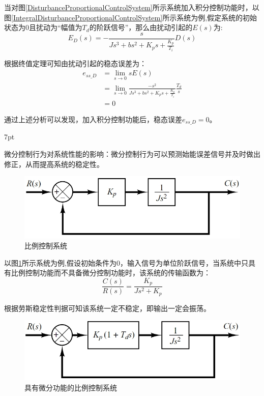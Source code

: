 \documentclass{article}
\numberwithin{equation}{section}
\numberwithin{figure}{section}
\newenvironment{formal}{%
\def\FrameCommand{%
\hspace{1pt}%
{\color{DarkBlue}\vrule width 2pt}%
{\color{formalshade}\vrule width 4pt}%
\colorbox{formalshade}%
}%
\MakeFramed{\advance\hsize-\width\FrameRestore}%
\noindent\hspace{-4.55pt}%
\begin{adjustwidth}{}{7pt}%
\vspace{2pt}\vspace{2pt}%
}
{%
\vspace{2pt}\end{adjustwidth}\endMakeFramed%
}
\begin{document}
当对图\ref{DisturbanceProportionalControlSystem}所示系统加入积分控制功能时，以图\ref{IntegralDisturbanceProportionalControlSystem}所示系统为例,假定系统的初始状态为0且扰动为“幅值为$T_d$的阶跃信号”，那么由扰动引起的$E(s)$为:
\begin{equation}
    E_D(s)=-\frac{s}{Js^3+bs^2+K_ps+\frac{K_p}{T_i}}D(s)
\end{equation}

根据终值定理可知由扰动引起的稳态误差为：
\begin{equation}
    \begin{split}
        e_{ss\_D}&=\lim_{s\rightarrow 0}sE(s)\\
        &=\lim_{s\rightarrow 0}\frac{-s^2}{Js^3+bs^2+K_ps+\frac{K_p}{T_i}}\frac{T_d}{s}\\
        &=0
    \end{split}
\end{equation}

通过上述分析可以发现，加入积分控制功能后，稳态误差$e_{ss\_D}=0$。

\begin{formal}
    微分控制行为对系统性能的影响：微分控制行为可以预测始能误差信号并及时做出修正，从而提高系统的稳定性。
\end{formal}

\begin{figure}
    \centering
    \includegraphics[width=.6\textwidth]{Chapter5/DerivativeProportionalControlSystem.png} %
    \caption{比例控制系统} %
    \label{DerivativeProportionalControlSystem} %
\end{figure}

以图\ref{DerivativeProportionalControlSystem}所示系统为例,假设初始条件为0，输入信号为单位阶跃信号，当系统中只具有比例控制功能而不具备微分控制功能时，该系统的传输函数为：
\begin{equation}
    \frac{C(s)}{R(s)}=\frac{K_p}{Js^2+K_p}
\end{equation}

根据劳斯稳定性判据可知该系统一定不稳定，即输出一定会振荡。

\begin{figure}
    \centering
    \includegraphics[width=.6\textwidth]{Chapter5/DerivativeProportionalControlSystem2.png} %
    \caption{具有微分功能的比例控制系统} %
    \label{DerivativeProportionalControlSystem2} %
\end{figure}
\end{document}
